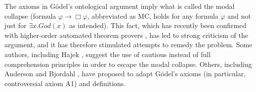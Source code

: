 \documentclass{birkjour}
\theoremstyle{definition}
\theoremstyle{remark}
\numberwithin{equation}{section}
\begin{document}

\maketitle


The axioms in G\"odel's ontological argument
\cite{GoedelNotes,ScottNotes} imply what is called the modal collapse
\cite{Sobel1987,SobelBook2004} (formula $\varphi \rightarrow \Box
\varphi$, abbreviated as MC, holds for any formula $\varphi$ and not
just for $\exists x. God(x)$ as intended). This fact, which has
recently been confirmed with higher-order automated theorem provers
\cite{J30,ECAI-2014}, has led to strong criticism of the argument, and
it has therefore stimulated attempts to remedy the problem. Some
authors, including Hajek
\cite{Hajek_der_Mathematiker,Hajek_Magari_and_others}, suggest the use
of cautious instead of full comprehension principles in order to
escape the modal collapse. Others, including Anderson
\cite{anderson90:_some_emend_of_goedel_ontol_proof,AndersonGettings}
and Bjordahl \cite{Bjordahl}, have proposed to adapt G\"odel's axioms (in
particular, controversial axiom A1) and definitions.
\end{document}
